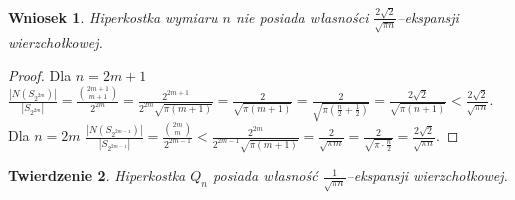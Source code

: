 \documentclass{pracamgr}
\newtheorem{theorem}{Twierdzenie}
\newtheorem{corollary}[theorem]{Wniosek}
\begin{document}
   \begin{corollary}\label{ograniczenie ekspansji}
    Hiperkostka wymiaru $n$ nie posiada własności $\frac{2\sqrt{2}}{\sqrt{\pi n}}$--ekspansji wierzchołkowej.
   \end{corollary}
   \begin{proof}
    Dla $n=2m+1$\newline
    $\frac{|N(S_{2^{2m}})|}{|S_{2^{2m}}|}=\frac{{2m+1 \choose m+1}}{2^{2m}}=\frac{2^{2m+1}}{2^{2m}\sqrt{\pi(m+1)}}=\frac{2}{\sqrt{\pi(m+1)}}=
    \frac{2}{\sqrt{\pi(\frac{n}{2}+\frac{1}{2})}}=\frac{2\sqrt{2}}{\sqrt{\pi(n+1)}}<\frac{2\sqrt{2}}{\sqrt{\pi n}}$.\newline
    Dla $n=2m$
    $\frac{|N(S_{2^{2m-1}})|}{|S_{2^{2m-1}}|}=\frac{{2m \choose m}}{2^{2m-1}}<\frac{2^{2m}}{2^{2m-1}\sqrt{\pi(m+1)}}=\frac{2}{\sqrt{\pi m}}=
    \frac{2}{\sqrt{\pi\cdot\frac{n}{2}}}=\frac{2\sqrt{2}}{\sqrt{\pi n}}$.
   \end{proof}
   \begin{theorem}\label{ekspansja kostki}%
    Hiperkostka $Q_n$ posiada własność $\frac{1}{\sqrt{\pi n}}$--ekspansji wierzchołkowej.
   \end{theorem}
\end{document}
